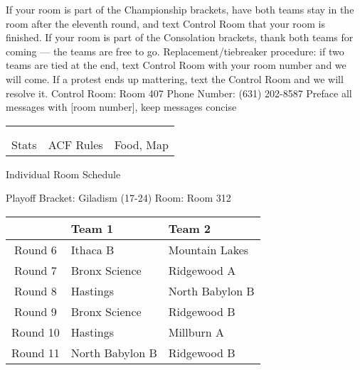 \documentclass{article}%
\begin{document}
\vspace*{16pt}%
\linebreak%
If your room is part of the Championship brackets, have both teams stay in the room after the eleventh round, and text Control Room that your room is finished.\newline%
\newline%
If your room is part of the Consolation brackets, thank both teams for coming — the teams are free to go.\newline%
\newline%
Replacement/tiebreaker procedure: if two teams are tied at the end, text Control Room with your room number and we will come. If a protest ends up mattering, text the Control Room and we will resolve it.\newline%
\newline%
Control Room: Room 407\newline%
Phone Number: (631) 202{-}8587\newline%
Preface all messages with {[}room number{]}, keep messages concise%
\vspace*{30pt}%
\newline%
%
\begin{tabularx}{\textwidth}{YYY}%
  &  &  \\%
\\%
Stats&ACF Rules&Food, Map\\%
\end{tabularx}%
\newpage%
\begin{center}%
\begin{Huge}%
Individual Room Schedule%
\end{Huge}%
\vspace*{16pt}%
\linebreak%
\begin{Large}%
Playoff Bracket: Giladism (17-24) \hfill Room: Room 312%
\end{Large}%
\end{center}%
%
\begin{tabularx}{\textwidth}{|c|Y|Y|}%
\hline%
&Team 1&Team 2\\%
\hline%
Round 6&Ithaca B&Mountain Lakes\\%
Round 7&Bronx Science&Ridgewood A\\%
Round 8&Hastings&North Babylon B\\%
Round 9&Bronx Science&Ridgewood B\\%
Round 10&Hastings&Millburn A\\%
Round 11&North Babylon B&Ridgewood B\\%
\hline%
\end{tabularx}%
\end{document}
